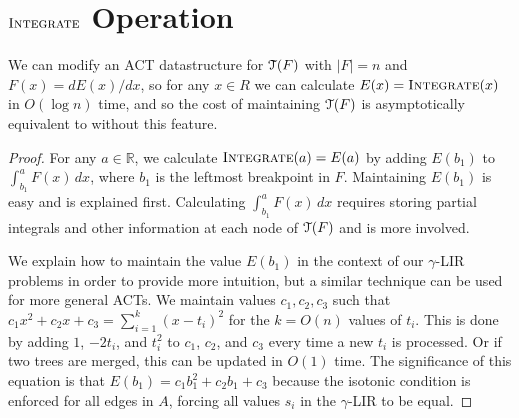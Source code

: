 \documentclass[11pt]{article}
\def\TT{\EuScript{T}}
\def\integrate{\mathop{\textsc{Integrate}}}
\renewcommand{\b}[1]{\ensuremath{\mathbb{#1}}}
\begin{document}
\section{$\integrate$ Operation}

\begin{lemma} 
We can modify an ACT datastructure for  $\TT(F)$ with $|F| =n$ and $F(x) = d E(x) / dx$, so for any $x \in R$ we can calculate $E(x) = \integrate(x)$ in $O(\log n)$ time, 
and so the cost of maintaining $\TT(F)$ is asymptotically equivalent to without this feature.
\label{lem:integrate}
\end{lemma}
\begin{proof}
For any $a \in \b{R}$, we calculate $\integrate(a) = E(a)$ by adding $E(b_1)$ to $\int_{b_1}^a F(x) \, dx$, where $b_1$ is the leftmost breakpoint in $F$.  Maintaining $E(b_1)$ is easy and is explained first.  Calculating $\int_{b_1}^a F(x) \, dx$ requires storing partial integrals and other information at each node of $\TT(F)$ and is more involved.  

We explain how to maintain the value $E(b_1)$ in the context of our $\gamma$-LIR problems in order to provide more intuition, but a similar technique can be used for more general ACTs.  
We maintain values $c_1, c_2, c_3$ such that $c_1 x^2 + c_2 x + c_3 = \sum_{i=1}^k (x-t_i)^2$ for the $k=O(n)$ values of $t_i$.  This is done by adding $1$, $-2t_i$, and $t_i^2$ to $c_1$, $c_2$, and $c_3$ every time a new $t_i$ is processed.  Or if two trees are merged, this can be updated in $O(1)$ time.  The significance of this equation is that $E(b_1) = c_1 b_1^2 + c_2 b_1 + c_3$ because the isotonic condition is enforced for all edges in $A$, forcing all values $s_i$ in the $\gamma$-LIR to be equal.  



\end{proof}
\end{document}
